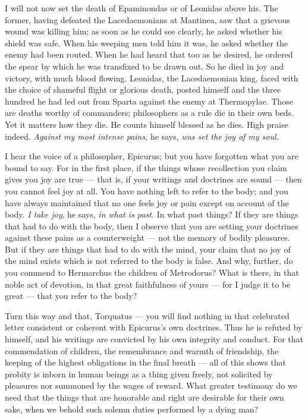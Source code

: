  I will not now set the death of Epaminondas or of Leonidas above his. The former, having defeated the Lacedaemonians at Mantinea, saw that a grievous wound was killing him; as soon as he could see clearly, he asked whether his shield was safe. When his weeping men told him it was, he asked whether the enemy had been routed. When he had heard that too as he desired, he ordered the spear by which he was transfixed to be drawn out. So he died in joy and victory, with much blood flowing. Leonidas, the Lacedaemonian king, faced with the choice of shameful flight or glorious death, posted himself and the three hundred he had led out from Sparta against the enemy at Thermopylae. Those are deaths worthy of commanders; philosophers as a rule die in their own beds. Yet it matters how they die. He counts himself blessed as he dies. High praise indeed. \textit{Against my most intense pains,} he says, \textit{was set the joy of my soul.}

 I hear the voice of a philosopher, Epicurus; but you have forgotten what you are bound to say. For in the first place, if the things whose recollection you claim gives you joy are true — that is, if your writings and doctrines are sound — then you cannot feel joy at all. You have nothing left to refer to the body; and you have always maintained that no one feels joy or pain except on account of the body. \textit{I take joy}, he says, \textit{in what is past.} In what past things? If they are things that had to do with the body, then I observe that you are setting your doctrines against these pains as a counterweight — not the memory of bodily pleasures. But if they are things that had to do with the mind, your claim that no joy of the mind exists which is not referred to the body is false. And why, further, do you commend to Hermarchus the children of Metrodorus? What is there, in that noble act of devotion, in that great faithfulness of yours — for I judge it to be great — that you refer to the body?

 Turn this way and that, Torquatus — you will find nothing in that celebrated letter consistent or coherent with Epicurus's own doctrines. Thus he is refuted by himself, and his writings are convicted by his own integrity and conduct. For that commendation of children, the remembrance and warmth of friendship, the keeping of the highest obligations in the final breath — all of this shows that probity is inborn in human beings as a thing given freely, not solicited by pleasures nor summoned by the wages of reward. What greater testimony do we need that the things that are honorable and right are desirable for their own sake, when we behold such solemn duties performed by a dying man?

